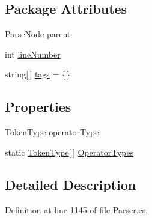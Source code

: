 \subsection*{Package Attributes}
\begin{DoxyCompactItemize}
\item 
\hyperlink{a00148}{Parse\-Node} \hyperlink{a00148_af313a82103fcc2ff5a177dbb06b92f7b}{parent}
\item 
int \hyperlink{a00148_a18b493382de0fde5b4299c1bd2250075}{line\-Number}
\item 
string\mbox{[}$\,$\mbox{]} \hyperlink{a00148_a58b3a15788fd2d4127d73619dc6d04ae}{tags} = \{\}
\end{DoxyCompactItemize}
\subsection*{Properties}
\begin{DoxyCompactItemize}
\item 
\hyperlink{a00051_a301aa7c866593a5b625a8fc158bbeace}{Token\-Type} \hyperlink{a00143_ac2de2f59be0e69b316627a4de16fadd3}{operator\-Type}
\item 
static \hyperlink{a00051_a301aa7c866593a5b625a8fc158bbeace}{Token\-Type}\mbox{[}$\,$\mbox{]} \hyperlink{a00143_ad8a4bb1b46dbc3d1b7708e78a2d97e1c}{Operator\-Types}
\end{DoxyCompactItemize}


\subsection{Detailed Description}


Definition at line 1145 of file Parser.\-cs.



